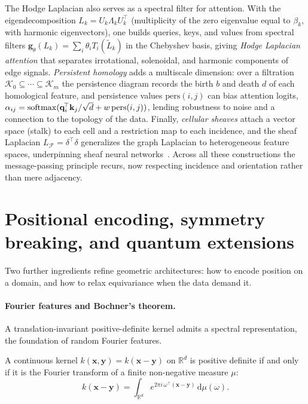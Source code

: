 The Hodge Laplacian also serves as a spectral filter for attention. With the
eigendecomposition $L_k = U_k\Lambda_k U_k^{\!\top}$ (multiplicity of the zero
eigenvalue equal to $\beta_k$, with harmonic eigenvectors), one builds queries,
keys, and values from spectral filters $\mathbf{g}_\theta(L_k) = \sum_i \theta_i
T_i(\tilde L_k)$ in the Chebyshev basis, giving \emph{Hodge Laplacian
attention} that separates irrotational, solenoidal, and harmonic components of
edge signals. \emph{Persistent homology} adds a multiscale dimension: over a
filtration $\mathcal{K}_0 \subseteq \cdots \subseteq \mathcal{K}_m$ the
persistence diagram records the birth $b$ and death $d$ of each homological
feature, and persistence values $\mathrm{pers}(i, j)$ can bias attention
logits, $\alpha_{ij} = \operatorname{softmax}(\mathbf{q}_i^{\!\top}\mathbf{k}_j / \sqrt{d} + w\,
\mathrm{pers}(i,j))$, lending robustness to noise and a connection to the
topology of the data. Finally, \emph{cellular sheaves} attach a vector space
(stalk) to each cell and a restriction map to each incidence, and the sheaf
Laplacian $L_\mathcal{F} = \delta^{\!\top}\delta$ generalizes the graph Laplacian
to heterogeneous feature spaces, underpinning sheaf neural
networks~\citep{hansen2021sheaf, bodnar2023cellular}. Across all these
constructions the message-passing principle recurs, now respecting incidence and
orientation rather than mere adjacency.

\section{Positional encoding, symmetry breaking, and quantum extensions}
\label{sec:gauge:positional}

Two further ingredients refine geometric architectures: how to encode position
on a domain, and how to relax equivariance when the data demand it.

\paragraph{Fourier features and Bochner's theorem.}
A translation-invariant positive-definite kernel admits a spectral
representation, the foundation of random Fourier features.

\begin{theorem}[Bochner]
\label{thm:gauge:bochner}
A continuous kernel $k(\mathbf{x}, \mathbf{y}) = k(\mathbf{x} - \mathbf{y})$ on
$\mathbb{R}^d$ is positive definite if and only if it is the Fourier transform of
a finite non-negative measure $\mu$:
\[
  k(\mathbf{x} - \mathbf{y}) = \int_{\mathbb{R}^d} e^{2\pi i\,
  \omega^{\!\top}(\mathbf{x} - \mathbf{y})}\, \mathrm{d}\mu(\omega).
\]
\end{theorem}

